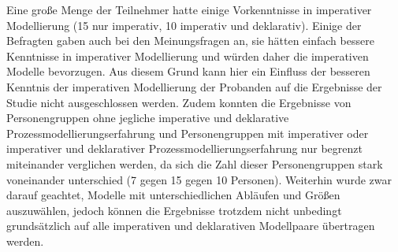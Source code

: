 Eine große Menge der Teilnehmer hatte einige Vorkenntnisse in imperativer Modellierung (15 nur imperativ, 10 imperativ und deklarativ). Einige der Befragten gaben auch bei den Meinungsfragen an, sie hätten einfach bessere Kenntnisse in imperativer Modellierung und würden daher die imperativen Modelle bevorzugen. Aus diesem Grund kann hier ein Einfluss der besseren Kenntnis der imperativen Modellierung der Probanden auf die Ergebnisse der Studie nicht ausgeschlossen werden. \newline 
Zudem konnten die Ergebnisse von Personengruppen ohne jegliche imperative und deklarative Prozessmodellierungserfahrung und Personengruppen mit imperativer oder imperativer und deklarativer Prozessmodellierungserfahrung nur begrenzt miteinander verglichen werden, da sich die Zahl dieser Personengruppen stark voneinander unterschied (7 gegen 15 gegen 10 Personen).\newline
Weiterhin wurde zwar darauf geachtet, Modelle mit unterschiedlichen Abläufen und Größen auszuwählen, jedoch können die Ergebnisse trotzdem nicht unbedingt grundsätzlich auf alle imperativen und deklarativen Modellpaare übertragen werden. \newline

 












